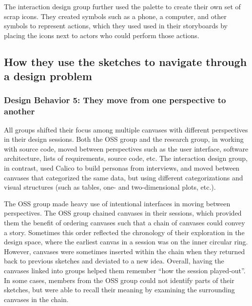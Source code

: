 The interaction design group further used the palette to create their own set of scrap icons. They created symbols such as a phone, a computer, and other symbols to represent actions, which they used used in their storyboards by placing the icons next to actors who could perform those actions.


%

\subsection{How they use the sketches to navigate through a design problem}

\subsubsection{Design Behavior 5: They move from one perspective to another}

All groups shifted their focus among multiple canvases with different perspectives in their design sessions. Both the OSS group and the research group, in working with source code, moved between perspectives such as the user interface, software architecture, lists of requirements, source code, etc. The interaction design group, in contrast, used Calico to build personas from interviews, and moved between canvases that categorized the same data, but using different categorizations and visual structures (such as tables, one- and two-dimensional plots, etc.). 

The OSS group made heavy use of intentional interfaces in moving between perspectives. The OSS group chained canvases in their sessions, which provided them the benefit of ordering canvases such that a chain of canvases could convey a story. Sometimes this order reflected the chronology of their exploration in the design space, where the earliest canvas in a session was on the inner circular ring. However, canvases were sometimes inserted within the chain when they returned back to previous sketches and deviated to a new idea. Overall, having the canvases linked into groups helped them remember ``how the session played-out''. In some cases, members from the OSS group could not identify parts of their sketches, but were able to recall their meaning by examining the surrounding canvases in the chain.

